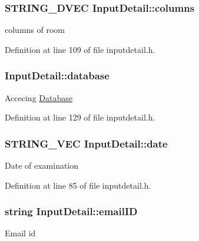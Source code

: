 \hypertarget{classInputDetail_a8563f1b6c4d2e74a9b8421a12585395c}{
\subsubsection[{columns}]{\setlength{\rightskip}{0pt plus 5cm}\-S\-T\-R\-I\-N\-G\-\_\-D\-V\-E\-C {\bf \-Input\-Detail\-::columns}}}\label{classInputDetail_a8563f1b6c4d2e74a9b8421a12585395c}
columns of room 

\-Definition at line 109 of file inputdetail.\-h.

\hypertarget{classInputDetail_a479cd6c13833bd5de6e5630078c961b6}{
\subsubsection[{database}]{ {\bf \-Input\-Detail\-::database}}}\label{classInputDetail_a479cd6c13833bd5de6e5630078c961b6}
\-Accecing \hyperlink{classDatabase}{\-Database} 

\-Definition at line 129 of file inputdetail.\-h.

\hypertarget{classInputDetail_a7d1c7ceb33eb86058e00c3a6a68cae4a}{
\subsubsection[{date}]{\setlength{\rightskip}{0pt plus 5cm}\-S\-T\-R\-I\-N\-G\-\_\-\-V\-E\-C {\bf \-Input\-Detail\-::date}}}\label{classInputDetail_a7d1c7ceb33eb86058e00c3a6a68cae4a}
\-Date of examination 

\-Definition at line 85 of file inputdetail.\-h.

\hypertarget{classInputDetail_ad3f1db4fddbe0d4efbf1d5bc74d52257}{
\subsubsection[{email\-I\-D}]{\setlength{\rightskip}{0pt plus 5cm}string {\bf \-Input\-Detail\-::email\-I\-D}}}\label{classInputDetail_ad3f1db4fddbe0d4efbf1d5bc74d52257}
\-Email id 

